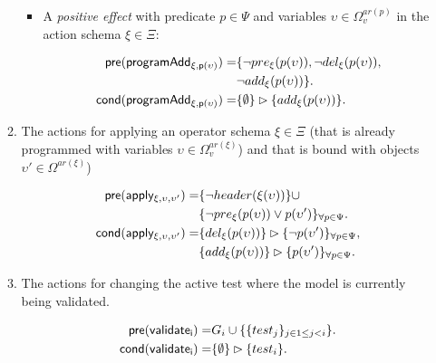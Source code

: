\documentclass[letterpaper]{article} %
\newcommand{\pre}{\mathsf{pre}}     %
\newcommand{\cond}{\mathsf{cond}}   %
\begin{document}
\begin{itemize}
\begin{enumerate}
\begin{itemize}
\item A {\em positive effect} with predicate $p\in\Psi$ and variables $\upsilon\in\Omega_v^{ar(p)}$ in the action schema $\xi\in\Xi$:
\begin{small}
\begin{align*}
\hspace*{7pt}\pre(\mathsf{programAdd_{\xi,p(\upsilon)}})=&\{\neg pre_{\xi}(p(\upsilon)),\neg del_{\xi}(p(\upsilon)),\\
                                                     &\neg add_{\xi}(p(\upsilon))\}.\\                                                   
\cond(\mathsf{programAdd_{\xi,p(\upsilon)}})=&\{\emptyset\}\rhd\{add_{\xi}(p(\upsilon))\}.
\end{align*}
\end{small}
\end{itemize}

\item The actions for applying an operator schema $\xi\in\Xi$ (that is already programmed with variables $\upsilon\in\Omega_v^{ar(\xi)}$) and that is bound with objects $\upsilon'\in\Omega^{ar(\xi)}$)
\begin{small}
\begin{align*}
\hspace*{7pt}\pre(\mathsf{apply_{\xi,\upsilon,\upsilon'}})=&\{\neg header(\xi(\upsilon))\}\cup\\     
                                           &\{\neg pre_{\xi}(p(\upsilon))\vee p(\upsilon')\}_{\forall p\in\Psi}.\\
\cond(\mathsf{apply_{\xi,\upsilon,\upsilon'}})=&\{del_{\xi}(p(\upsilon))\}\rhd\{\neg p(\upsilon')\}_{\forall p\in\Psi},\\
&\{add_{\xi}(p(\upsilon))\}\rhd\{p(\upsilon')\}_{\forall p\in\Psi}.
\end{align*}
\end{small}

\item The actions for changing the active test where the model is currently being validated.
\begin{small}
\begin{align*}
\hspace*{7pt}\pre(\mathsf{validate_{i}})=&G_i\cup\{\{test_j\}_{j\in 1\leq j<i}\}.\\
\cond(\mathsf{validate_{i}})=&\{\emptyset\}\rhd\{test_i\}.
\end{align*}
\end{small}
\end{enumerate}
\end{itemize}
\end{document}
